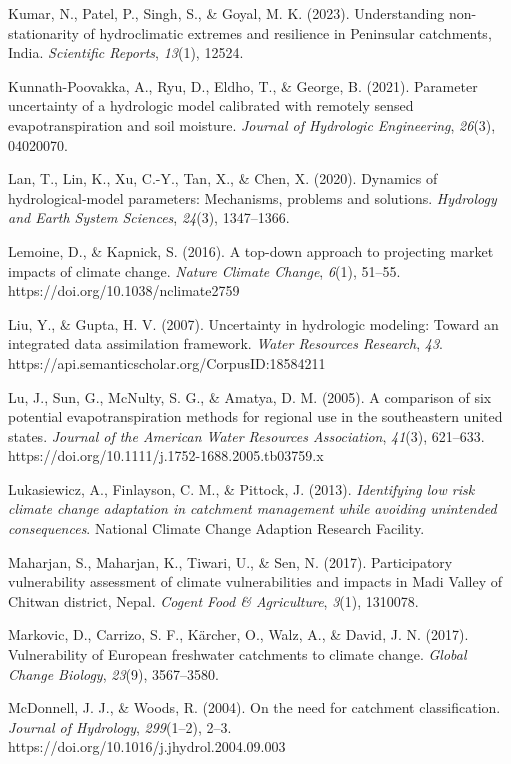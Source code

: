 \documentclass[
]{article}
\begin{document}
Kumar, N., Patel, P., Singh, S., \& Goyal, M. K. (2023). Understanding
non-stationarity of hydroclimatic extremes and resilience in Peninsular
catchments, India. \emph{Scientific Reports}, \emph{13}(1), 12524.

Kunnath-Poovakka, A., Ryu, D., Eldho, T., \& George, B. (2021).
Parameter uncertainty of a hydrologic model calibrated with remotely
sensed evapotranspiration and soil moisture. \emph{Journal of Hydrologic
Engineering}, \emph{26}(3), 04020070.

Lan, T., Lin, K., Xu, C.-Y., Tan, X., \& Chen, X. (2020). Dynamics of
hydrological-model parameters: Mechanisms, problems and solutions.
\emph{Hydrology and Earth System Sciences}, \emph{24}(3), 1347--1366.

Lemoine, D., \& Kapnick, S. (2016). A top-down approach to projecting
market impacts of climate change. \emph{Nature Climate Change},
\emph{6}(1), 51--55. https://doi.org/10.1038/nclimate2759

Liu, Y., \& Gupta, H. V. (2007). Uncertainty in hydrologic modeling:
Toward an integrated data assimilation framework. \emph{Water Resources
Research}, \emph{43}. https://api.semanticscholar.org/CorpusID:18584211

Lu, J., Sun, G., McNulty, S. G., \& Amatya, D. M. (2005). A comparison
of six potential evapotranspiration methods for regional use in the
southeastern united states. \emph{Journal of the American Water
Resources Association}, \emph{41}(3), 621--633.
https://doi.org/10.1111/j.1752-1688.2005.tb03759.x

Lukasiewicz, A., Finlayson, C. M., \& Pittock, J. (2013).
\emph{Identifying low risk climate change adaptation in catchment
management while avoiding unintended consequences}. National Climate
Change Adaption Research Facility.

Maharjan, S., Maharjan, K., Tiwari, U., \& Sen, N. (2017). Participatory
vulnerability assessment of climate vulnerabilities and impacts in Madi
Valley of Chitwan district, Nepal. \emph{Cogent Food \& Agriculture},
\emph{3}(1), 1310078.

Markovic, D., Carrizo, S. F., Kärcher, O., Walz, A., \& David, J. N.
(2017). Vulnerability of European freshwater catchments to climate
change. \emph{Global Change Biology}, \emph{23}(9), 3567--3580.

McDonnell, J. J., \& Woods, R. (2004). On the need for catchment
classification. \emph{Journal of Hydrology}, \emph{299}(1--2), 2--3.
https://doi.org/10.1016/j.jhydrol.2004.09.003
\end{document}
